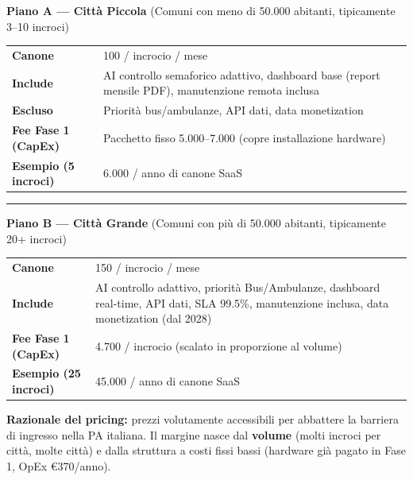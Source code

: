 \documentclass[a4paper,11pt]{article}
\begin{document}
\begin{tcolorbox}[
    enhanced, colback=blue!5!white, colframe=SmartBlue,
    title=\textbf{I Due Piani SmartLight}, fonttitle=\bfseries\large,
    boxrule=0.5mm, drop shadow
]

\textbf{\large Piano A --- Città Piccola}
{\small (Comuni con meno di 50.000 abitanti, tipicamente 3--10 incroci)}

\begin{tabular}{>{\bfseries}l p{9cm}}
Canone              & \texteuro{}100 / incrocio / mese \\
Include             & AI controllo semaforico adattivo, dashboard base (report mensile PDF), manutenzione remota inclusa \\
Escluso             & Priorità bus/ambulanze, API dati, data monetization \\
Fee Fase 1 (CapEx)  & Pacchetto fisso \texteuro{}5.000--7.000 (copre installazione hardware) \\
Esempio (5 incroci) & \texteuro{}6.000 / anno di canone SaaS \\
\end{tabular}

\vspace{0.4cm}\hrule\vspace{0.4cm}

\textbf{\large Piano B --- Città Grande}
{\small (Comuni con più di 50.000 abitanti, tipicamente 20+ incroci)}

\begin{tabular}{>{\bfseries}l p{9cm}}
Canone              & \texteuro{}150 / incrocio / mese \\
Include             & AI controllo adattivo, priorità Bus/Ambulanze, dashboard real-time, API dati, SLA 99.5\%, manutenzione inclusa, data monetization (dal 2028) \\
Fee Fase 1 (CapEx)  & \texteuro{}4.700 / incrocio (scalato in proporzione al volume) \\
Esempio (25 incroci) & \texteuro{}45.000 / anno di canone SaaS \\
\end{tabular}

\end{tcolorbox}

\vspace{0.3cm}
\noindent\textbf{Razionale del pricing:} prezzi volutamente accessibili per abbattere
la barriera di ingresso nella PA italiana. Il margine nasce dal \textbf{volume}
(molti incroci per città, molte città) e dalla struttura a costi fissi bassi
(hardware già pagato in Fase 1, OpEx €370/anno).
\end{document}
